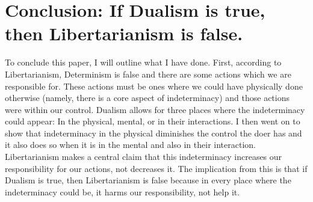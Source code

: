 \section{Conclusion: If Dualism is true, then Libertarianism is false.}
To conclude this paper, I will outline what I have done. First, according to Libertarianism, Determinism is false and there are some actions which we are responsible for. These actions must be ones where we could have physically done otherwise (namely, there is a core aspect of indeterminacy) and those actions were within our control. Dualism allows for three places where the indeterminacy could appear: In the physical, mental, or in their interactions. I then went on to show that indeterminacy in the physical diminishes the control the doer has and it also does so when it is in the mental and also in their interaction. Libertarianism makes a central claim that this indeterminacy increases our responsibility for our actions, not decreases it. The implication from this is that if Dualism is true, then Libertarianism is false because in every place where the indeterminacy could be, it harms our responsibility, not help it.

\setcounter{footnote}{\thefb}

